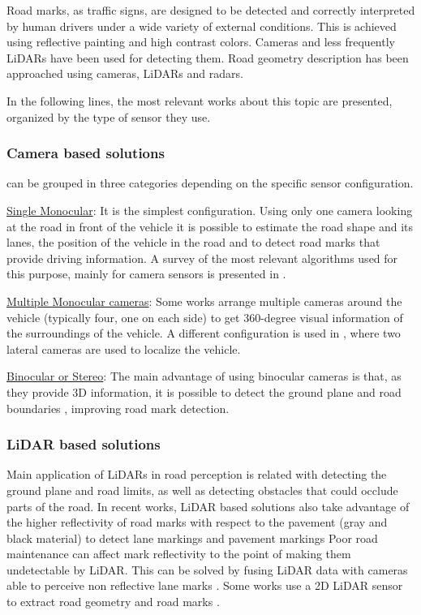 Road marks, as traffic signs, are designed to be detected and 
correctly interpreted by human drivers under a wide variety of external 
conditions. This is achieved using reflective painting and high contrast 
colors. Cameras and less frequently LiDARs have been used for detecting them.
Road geometry description has been approached using cameras, LiDARs and radars.

In the following lines, the most relevant works about this topic are presented, 
organized by the type of sensor they use.


\subsubsection{Camera based solutions}
can be grouped in three categories depending on the specific sensor 
configuration.

\underline{Single Monocular}:
It is the simplest configuration. Using only one 
camera looking at the road in front of the vehicle it is possible to estimate 
the road shape and its lanes, the position of the vehicle in the road and to 
detect road marks  that provide driving information. A survey of the most 
relevant algorithms used for this purpose, mainly for camera sensors is 
presented in \cite{hillel2014recent}.

\underline{Multiple Monocular cameras}: 
Some works \cite{lee2017avm, kum2013lane} arrange multiple cameras 
around the vehicle (typically four, one on each side) to get 360-degree 
visual information of the surroundings of the vehicle. 
A different configuration is used in \cite{Ieng2003}, where two lateral cameras
are used to localize the vehicle. 

\underline{Binocular or Stereo}: 
The main advantage of using binocular cameras is that, as they provide 3D 
information, it is possible to detect the ground plane and road boundaries 
\cite{schreiber2013laneloc, ozgunalp2017multiple}, improving road mark 
detection. 

\subsubsection{LiDAR based solutions}
Main application of LiDARs in road perception is related with detecting the 
ground plane and road limits, as well as detecting obstacles that could occlude 
parts of the road.
In recent works, LiDAR based solutions also take advantage of the higher 
reflectivity of road marks with respect to the pavement (gray and black material) to 
detect lane markings \cite{yang2012automated, li2013new} and pavement markings \cite{Zhang2016}
Poor road maintenance can affect mark reflectivity to the point of making them
undetectable by LiDAR. This can be solved by fusing LiDAR 
data with cameras able to perceive non reflective lane marks \cite{lee2017avm}.
Some works use a 2D LiDAR sensor to extract road geometry and road marks 
\cite{nie2012camera, kim2015lane}.

